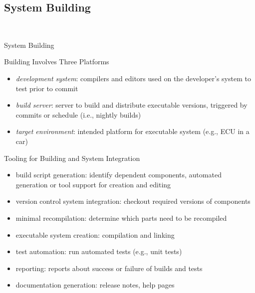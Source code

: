 \subsection{System Building}
\begin{frame}{\insertsubsection\ \mytitlesource{\sommerville}}
	\begin{fancycolumns}
		\begin{definition}{System Building}
		\end{definition}
		\begin{definition}{Building Involves Three Platforms}
			\begin{itemize}
				\item \emph{development system}: compilers and editors used on the developer's system to test prior to commit
				\item \emph{build server}: server to build and distribute executable versions, triggered by commits or schedule (i.e., nightly builds)
				\item \emph{target environment}: intended platform for executable system (e.g., ECU in a car)
			\end{itemize}
		\end{definition}
		\nextcolumn
		\begin{definition}{Tooling for Building and System Integration}
			\begin{itemize}
				\item build script generation: identify dependent components, automated generation or tool support for creation and editing
				\item version control system integration: checkout required versions of components
				\item minimal recompilation: determine which parts need to be recompiled
				\item executable system creation: compilation and linking
				\item test automation: run automated tests (e.g., unit tests)
				\item reporting: reports about success or failure of builds and tests
				\item documentation generation: release notes, help pages
			\end{itemize}
		\end{definition}
	\end{fancycolumns}
\end{frame}

